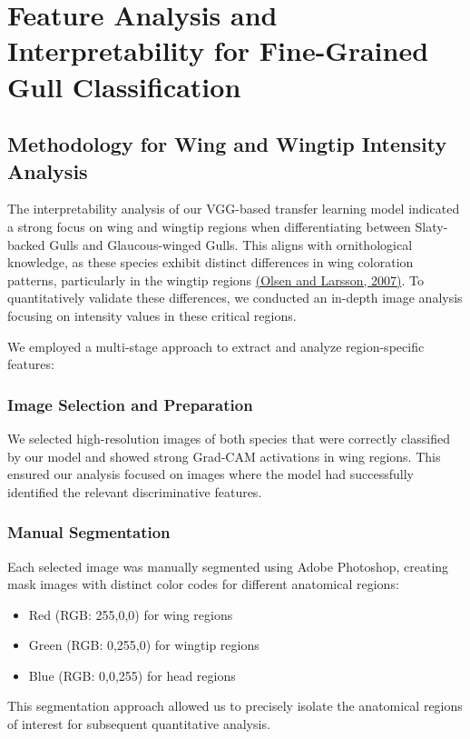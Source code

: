 \documentclass[a4paper,12pt]{report}
\begin{document}
\section{Feature Analysis and Interpretability for Fine-Grained Gull Classification}

\subsection{Methodology for Wing and Wingtip Intensity Analysis}

The interpretability analysis of our VGG-based transfer learning model indicated a strong focus on wing and wingtip regions when differentiating between Slaty-backed Gulls and Glaucous-winged Gulls. This aligns with ornithological knowledge, as these species exhibit distinct differences in wing coloration patterns, particularly in the wingtip regions \href{https://doi.org/10.1111/j.1474-919X.2007.00703.x}{(Olsen and Larsson, 2007)}. To quantitatively validate these differences, we conducted an in-depth image analysis focusing on intensity values in these critical regions.

We employed a multi-stage approach to extract and analyze region-specific features:

\subsubsection{Image Selection and Preparation}
We selected high-resolution images of both species that were correctly classified by our model and showed strong Grad-CAM activations in wing regions. This ensured our analysis focused on images where the model had successfully identified the relevant discriminative features.

\subsubsection{Manual Segmentation}
Each selected image was manually segmented using Adobe Photoshop, creating mask images with distinct color codes for different anatomical regions:
\begin{itemize}
    \item Red (RGB: 255,0,0) for wing regions
    \item Green (RGB: 0,255,0) for wingtip regions
    \item Blue (RGB: 0,0,255) for head regions
\end{itemize}

This segmentation approach allowed us to precisely isolate the anatomical regions of interest for subsequent quantitative analysis.
\end{document}

